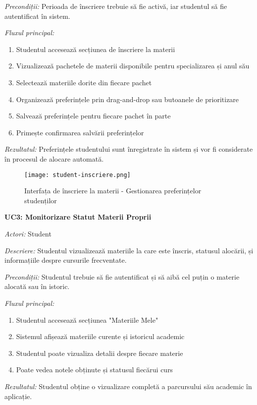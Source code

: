 \documentclass[12pt,a4paper]{report}
\begin{document}
\textit{Precondiții:} Perioada de înscriere trebuie să fie activă, iar studentul să fie autentificat în sistem.

\textit{Fluxul principal:}
\begin{enumerate}
\item Studentul accesează secțiunea de înscriere la materii
\item Vizualizează pachetele de materii disponibile pentru specializarea și anul său
\item Selectează materiile dorite din fiecare pachet
\item Organizează preferințele prin drag-and-drop sau butoanele de prioritizare
\item Salvează preferințele pentru fiecare pachet în parte
\item Primește confirmarea salvării preferințelor
\end{enumerate}

\textit{Rezultatul:} Preferințele studentului sunt înregistrate în sistem și vor fi considerate în procesul de alocare automată.

\begin{figure}[H]
\centering
\texttt{[image: student-inscriere.png]}
\caption{Interfața de înscriere la materii - Gestionarea preferințelor studenților}
\label{fig:student-inscriere}
\end{figure}

\textbf{UC3: Monitorizare Statut Materii Proprii}

\textit{Actori:} Student

\textit{Descriere:} Studentul vizualizează materiile la care este înscris, statusul alocării, și informațiile despre cursurile frecventate.

\textit{Precondiții:} Studentul trebuie să fie autentificat și să aibă cel puțin o materie alocată sau în istoric.

\textit{Fluxul principal:}
\begin{enumerate}
\item Studentul accesează secțiunea "Materiile Mele"
\item Sistemul afișează materiile curente și istoricul academic
\item Studentul poate vizualiza detalii despre fiecare materie
\item Poate vedea notele obținute și statusul fiecărui curs
\end{enumerate}

\textit{Rezultatul:} Studentul obține o vizualizare completă a parcursului său academic în aplicație.
\end{document}
